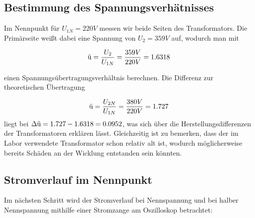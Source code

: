 \documentclass{article}
\begin{document}
\subsection{Bestimmung des Spannungsverhätnisses}
\label{sec:best-des-spann}

Im Nennpunkt für $U_{1N} = 220V$ messen wir beide Seiten des Transformators. Die Primärseite weißt dabei eine Spannung von $U_{2} = 359V$ auf, wodurch man mit

\begin{equation*}
  \textnormal{ü} = \frac{U_{2}}{U_{1N}} = \frac{359V}{220V} = 1.6318
\end{equation*}

einen Spannungsübertragungsverhältnis berechnen. Die Differenz zur theoretischen Übertragung

\begin{equation*}
  \label{eq:3}
  \textnormal{ü} = \frac{U_{2N}}{U_{1N}} = \frac{380V}{220V} = 1.727
\end{equation*}
liegt bei $\Delta \textnormal{ü} = 1.727 - 1.6318 = 0.0952 $, was sich über die Herstellungsdifferenzen der Transformatoren erklären lässt. Gleichzeitig ist zu bemerken, dass der im Labor verwendete Transformator schon relativ alt ist, wodurch möglicherweise bereits Schäden an der Wicklung entstanden sein könnten.


\subsection{Stromverlauf im Nennpunkt}
\label{sec:stromv-im-nennp}

Im nächsten Schritt wird der Stromverlauf bei Nennspannung und bei halber Nennspannung mithilfe einer Stromzange am Oszilloskop betrachtet:
\end{document}
